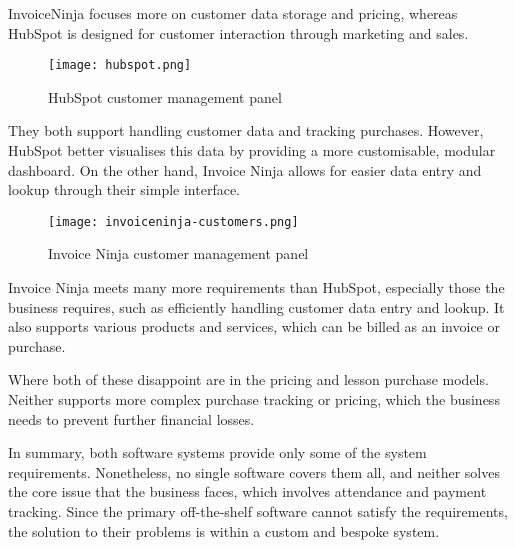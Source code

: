 InvoiceNinja focuses more on customer data storage and pricing, whereas HubSpot is designed for customer interaction through marketing and sales.

\begin{figure}[ht!]
    \centerline{\texttt{[image: hubspot.png]}}
    \caption{HubSpot customer management panel}
    \label{fig:hubspot}
\end{figure}

They both support handling customer data and tracking purchases. However, HubSpot better visualises this data by providing a more customisable, modular dashboard. On the other hand, Invoice Ninja allows for easier data entry and lookup through their simple interface.

\begin{figure}[ht!]
    \centerline{\texttt{[image: invoiceninja-customers.png]}}
    \caption{Invoice Ninja customer management panel}
    \label{fig:invoiceninja}
\end{figure}

Invoice Ninja meets many more requirements than HubSpot, especially those the business requires, such as efficiently handling customer data entry and lookup. It also supports various products and services, which can be billed as an invoice or purchase.

Where both of these disappoint are in the pricing and lesson purchase models. Neither supports more complex purchase tracking or pricing, which the business needs to prevent further financial losses.

In summary, both software systems provide only some of the system requirements. Nonetheless, no single software covers them all, and neither solves the core issue that the business faces, which involves attendance and payment tracking. Since the primary off-the-shelf software cannot satisfy the requirements, the solution to their problems is within a custom and bespoke system.
